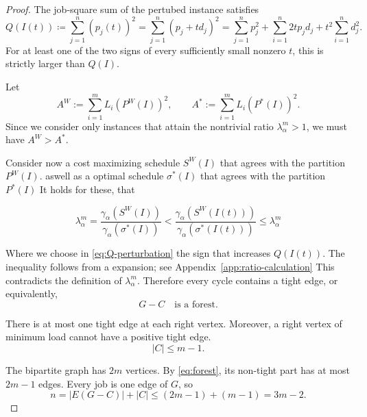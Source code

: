 \documentclass[11pt]{article}
\begin{document}
\begin{proof}
The job-square sum  of the pertubed instance satisfies
\begin{equation}\label{eq:Q-perturbation}
 Q(I(t)) \coloneq \sum_{j=1}^{n} (p_j(t))^2 = \sum_{j=1}^{n} (p_j+t d_j)^2 = \sum_{j=1}^{n}p_j^2+ \sum_{i=1}^{n}2tp_jd_j + t^2 \sum_{i=1}^{n}d_j^2.
\end{equation}
For at least one of the two signs of every sufficiently small nonzero $t$, this
is strictly larger than $Q(I)$.

Let
\[
 A^W:=\sum_{i=1}^{m} L_i(P^{W}(I))^2,
 \qquad A^{*}:=\sum_{i=1}^{m} L_i(P^{*}(I))^2.
\]
Since we consider only instances that attain the nontrivial ratio
$\lambda^{m}_{\alpha}>1$, we must have
$A^{W}>A^{*}$.


Consider now a cost maximizing schedule $S^W(I)$ that agrees with the partition $P^W(I)$. 
aswell as  a optimal schedule $\sigma^{*}(I)$ that agrees with the partition $P^{*}(I)$
It holds for these, that

\[
\lambda_{\alpha}^{m}=
\frac{\gamma_{\alpha}(S^W(I))}{\gamma_{\alpha}(\sigma^{*}(I))}
<
\frac{\gamma_{\alpha}(S^W(I(t)))}{\gamma_{\alpha}(\sigma^{*}(I(t)))} \le \lambda_{\alpha}^m
\]

Where we choose in \eqref{eq:Q-perturbation} the sign that increases $Q(I(t))$.
The inequality follows from a expansion; see Appendix~\eqref{app:ratio-calculation}
This contradicts the definition of
$\lambda_{\alpha}^m$.  Therefore every cycle contains a tight
edge, or equivalently,
\begin{equation}\label{eq:forest}
 G-C\quad\text{is a forest}.
\end{equation}

There is at most one tight edge at each right vertex.  Moreover, a right
vertex of minimum load cannot have a positive tight edge.
\begin{equation}\label{eq:C-bound}
 |C|\leq m-1.
\end{equation}

The bipartite graph has $2m$ vertices.  By
\eqref{eq:forest}, its non-tight part has at most $2m-1$ edges.
Every job is one edge of $G$, so
\[
 n=|E(G-C)|+|C|
 \leq(2m-1)+(m-1)=3m-2.
\]
\end{proof}
\end{document}

